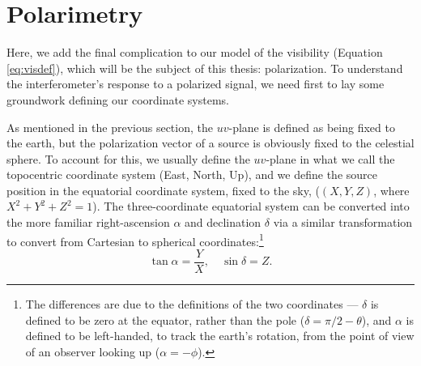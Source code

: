 \section{Polarimetry}
\label{sec:Polarimetry}

Here, we add the final complication to our model of the visibility (Equation \ref{eq:visdef}), which
will be the subject of this thesis: polarization. To understand the interferometer's 
response to a polarized signal, we need first to lay some groundwork defining our coordinate systems.

As mentioned in the previous section, the $uv$-plane is defined as being
fixed to the earth, but the polarization vector of a source is obviously fixed to the celestial
sphere. To account for this, we usually define the $uv$-plane in what we call the topocentric
coordinate system (East, North, Up), and we define the source position in the equatorial coordinate
system, fixed to the sky, ($(X,Y,Z)$, where $X^2 + Y^2 + Z^2 = 1$). The three-coordinate equatorial
system can be converted into the more familiar right-ascension
$\alpha$ and declination $\delta$
via a similar transformation to convert from Cartesian to spherical coordinates:\footnote{The
  differences are due to the definitions of the two coordinates --- $\delta$ is defined to be zero
  at the equator, rather than the pole ($\delta=\pi/2-\theta$), and $\alpha$ is defined to be left-handed, to track the
earth's rotation, from the point of view of an observer looking up ($\alpha = -\phi$).}
\begin{equation}
  \tan\alpha = \frac{Y}{X}, \quad
  \sin\delta = Z.
\end{equation}


